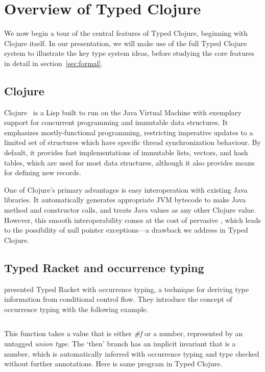 \section{Overview of Typed Clojure}

\label{sec:overview}

We now begin a tour of the central features of Typed Clojure,
beginning with Clojure itself. In our presentation, we will make 
use of the full Typed Clojure system to illustrate the key type system
ideas, before studying the core features in detail in
section~\ref{sec:formal}. 

\subsection{Clojure}

Clojure~\cite{Hic08} is a Lisp built to run on the
Java Virtual Machine with exemplary support for concurrent programming
and immutable data structures. It emphasizes mostly-functional
programming, restricting imperative updates to a limited set of
structures which have specific thread synchronization behaviour. By
default, it provides fast implementations of immutable lists, vectors,
and hash tables, which are used for most data structures, although it
also provides means for defining new records.

One of Clojure's primary advantages is easy interoperation with
existing Java libraries. It automatically generates appropriate JVM
bytecode to make Java method and constructor calls, and treats Java
values as any other Clojure value. However, this smooth
interoperability comes at the cost of pervasive , which
leads to the possibility of null pointer exceptions---a drawback we
address in Typed Clojure.

\subsection{Typed Racket and occurrence typing}

\citet{TF10}
presented Typed Racket with occurrence typing,
a technique for deriving type information from conditional control flow.
They introduce the concept of occurrence typing 
with the following example.

\inputminted[firstline=1]{racket}{code/tr/example1.rkt}

This function takes a value that is either \emph{\#f} %
or a number, represented by an untagged \emph{union type}.
The `then' branch has an implicit invariant
that  is a number, which is automatically inferred with occurrence typing
and type checked without further annotations.
Here is same program in Typed Clojure.

